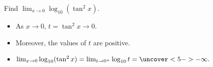 \begin{frame}
\begin{example}%
Find $\lim_{x\rightarrow 0} \log_{10} (\tan^2 x)$.
\begin{itemize}
\item<2->  As $x\rightarrow 0$, $t = \tan^2 x \rightarrow 0$.
\item<3->  Moreover, the values of $t$ are positive.
\item<4->  $\lim_{x\rightarrow 0} \log_{10}(\tan^2 x) = \lim_{t\rightarrow 0^+} \log_{10} t = \uncover<5->{-\infty .}$
\end{itemize}
\end{example}
\end{frame}
